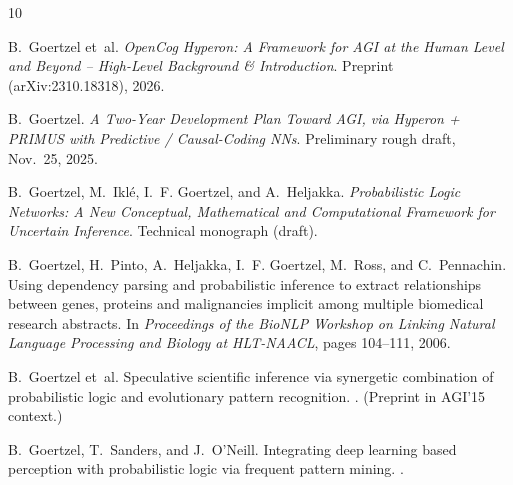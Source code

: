 \documentclass[11pt]{article}
\begin{document}

\begin{thebibliography}{10}

B.~Goertzel et~al.
\newblock \emph{OpenCog Hyperon: A Framework for AGI at the Human Level and Beyond -- High-Level Background \& Introduction}.
\newblock Preprint (arXiv:2310.18318), 2026.

B.~Goertzel.
\newblock \emph{A Two-Year Development Plan Toward AGI, via Hyperon + PRIMUS with Predictive / Causal-Coding NNs}.
\newblock Preliminary rough draft, Nov.~25, 2025.

B.~Goertzel, M.~Ikl{\'e}, I.~F. Goertzel, and A.~Heljakka.
\newblock \emph{Probabilistic Logic Networks: A New Conceptual, Mathematical and Computational Framework for Uncertain Inference}.
\newblock Technical monograph (draft).

B.~Goertzel, H.~Pinto, A.~Heljakka, I.~F. Goertzel, M.~Ross, and C.~Pennachin.
\newblock Using dependency parsing and probabilistic inference to extract relationships between genes, proteins and malignancies implicit among multiple biomedical research abstracts.
\newblock In \emph{Proceedings of the BioNLP Workshop on Linking Natural Language Processing and Biology at HLT-NAACL}, pages 104--111, 2006.

B.~Goertzel et~al.
\newblock Speculative scientific inference via synergetic combination of probabilistic logic and evolutionary pattern recognition.
. (Preprint in AGI'15 context.)

B.~Goertzel, T.~Sanders, and J.~O'Neill.
\newblock Integrating deep learning based perception with probabilistic logic via frequent pattern mining.
.

\end{thebibliography}
\end{document}
